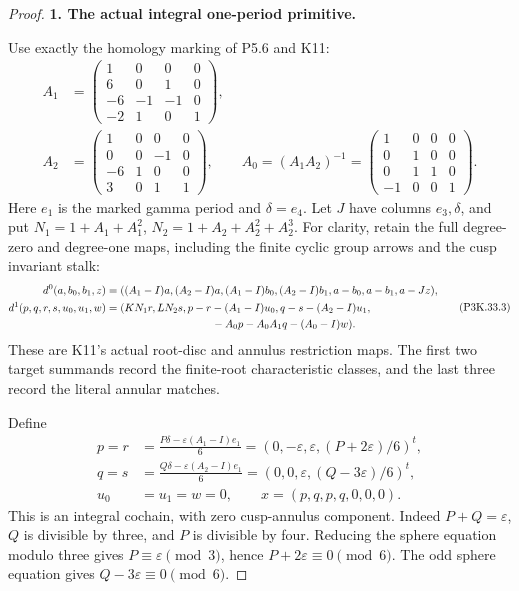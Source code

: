 \begin{proof}
\par\medskip\noindent\textbf{1. The actual integral one-period primitive.}\enspace

Use exactly the homology marking of P5.6 and K11:
\[
\begin{split}
 A_1&=\begin{pmatrix}
 1&0&0&0\\6&0&1&0\\-6&-1&-1&0\\-2&1&0&1
 \end{pmatrix},\\
 A_2&=\begin{pmatrix}
 1&0&0&0\\0&0&-1&0\\-6&1&0&0\\3&0&1&1
 \end{pmatrix},\qquad
 A_0=(A_1A_2)^{-1}
 =\begin{pmatrix}
 1&0&0&0\\0&1&0&0\\0&1&1&0\\-1&0&0&1
 \end{pmatrix}.
\end{split}                                                     \tag{P3K.33.2}
\]
Here \(e_1\) is the marked gamma period and \(\delta=e_4\).
Let \(J\) have columns \(e_3,\delta\), and put
\(N_1=1+A_1+A_1^2\), \(N_2=1+A_2+A_2^2+A_2^3\).
For clarity, retain the full degree-zero and degree-one maps,
including the finite cyclic group arrows and the cusp invariant stalk:
\[
\begin{split}
 d^0(a,b_0,b_1,z)={}&((A_1-I)a,(A_2-I)a,
 (A_1-I)b_0,(A_2-I)b_1,a-b_0,a-b_1,a-Jz),\\
 d^1(p,q,r,s,u_0,u_1,w)={}&(KN_1r,LN_2s,
 p-r-(A_1-I)u_0,q-s-(A_2-I)u_1,\\
 &\hspace{30mm}-A_0p-A_0A_1q-(A_0-I)w).
\end{split}                                                     \tag{P3K.33.3}
\]
These are K11's actual root-disc and annulus restriction maps.
The first two target summands record the finite-root characteristic
classes, and the last three record the literal annular matches.

Define
\[
\begin{split}
 p=r&=\frac{P\delta-\varepsilon(A_1-I)e_1}{6}
       =(0,-\varepsilon,\varepsilon,(P+2\varepsilon)/6)^t,\\
 q=s&=\frac{Q\delta-\varepsilon(A_2-I)e_1}{6}
       =(0,0,\varepsilon,(Q-3\varepsilon)/6)^t,\\
 u_0&=u_1=w=0,
 \qquad x=(p,q,p,q,0,0,0).
\end{split}                                                     \tag{P3K.33.4}
\]
This is an integral cochain, with zero cusp-annulus component.
Indeed \(P+Q=\varepsilon\), \(Q\) is divisible by three, and \(P\)
is divisible by four. Reducing the sphere equation modulo three
gives \(P\equiv\varepsilon\pmod3\), hence
\(P+2\varepsilon\equiv0\pmod6\). The odd sphere equation
gives \(Q-3\varepsilon\equiv0\pmod6\).


\end{proof}
